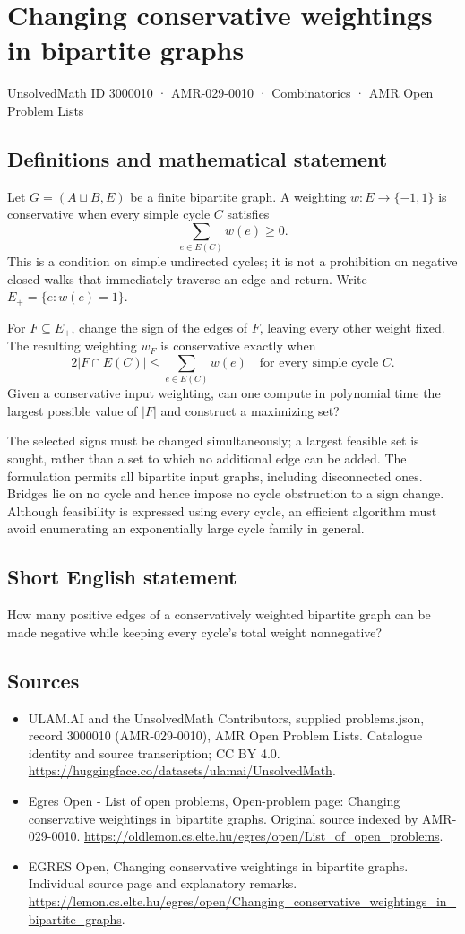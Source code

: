 \documentclass[11pt,a4paper]{article}
\begin{document}
\section*{Changing conservative weightings in bipartite graphs}\label{3000010}
{\small UnsolvedMath ID 3000010 · AMR-029-0010 · Combinatorics · AMR Open Problem Lists}
\subsection{Definitions and mathematical statement}
Let $G=(A\sqcup B,E)$ be a finite bipartite graph. A weighting
$w:E\to\{-1,1\}$ is conservative when every simple cycle $C$ satisfies
\[
                              \sum_{e\in E(C)}w(e)\ge0.
\]
This is a condition on simple undirected cycles; it is not a prohibition
on negative closed walks that immediately traverse an edge and return.
Write $E_+=\{e:w(e)=1\}$.

For $F\subseteq E_+$, change the sign of the edges of $F$, leaving every
other weight fixed. The resulting weighting $w_F$ is conservative exactly
when
\[
                  2|F\cap E(C)|\le\sum_{e\in E(C)}w(e)
                                      \quad\text{for every simple cycle }C.
\]
Given a conservative input weighting, can one compute in polynomial time
the largest possible value of $|F|$ and construct a maximizing set?

The selected signs must be changed simultaneously; a largest feasible
set is sought, rather than a set to which no additional edge can be added.
The formulation permits all bipartite input graphs, including disconnected
ones. Bridges lie on no cycle and hence impose no cycle obstruction to a
sign change. Although feasibility is expressed using every cycle, an
efficient algorithm must avoid enumerating an exponentially large cycle
family in general.
\subsection{Short English statement}
How many positive edges of a conservatively weighted bipartite
graph can be made negative while keeping every cycle's total weight nonnegative?
\subsection{Sources}
\begin{itemize}
\item[S1] ULAM.AI and the UnsolvedMath Contributors, supplied problems.json, record 3000010 (AMR-029-0010), AMR Open Problem Lists. Catalogue identity and source transcription; CC BY 4.0.
\url{https://huggingface.co/datasets/ulamai/UnsolvedMath}.
\item[S2] Egres Open - List of open problems, Open-problem page: Changing conservative weightings in bipartite graphs. Original source indexed by AMR-029-0010.
\url{https://oldlemon.cs.elte.hu/egres/open/List_of_open_problems}.
\item[S3] EGRES Open, Changing conservative weightings in bipartite graphs. Individual source page and explanatory remarks.
\url{https://lemon.cs.elte.hu/egres/open/Changing_conservative_weightings_in_bipartite_graphs}.
\end{itemize}
\end{document}
